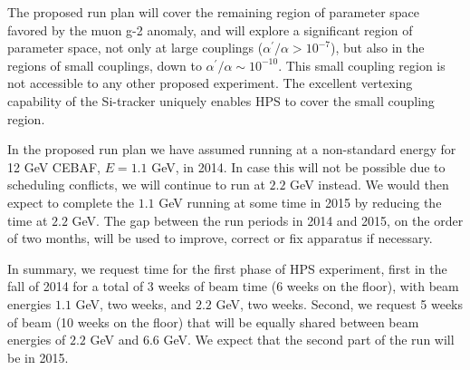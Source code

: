 The proposed run plan will cover the remaining region of parameter space favored by the muon \mbox{g-2} anomaly, and will explore a significant 
region of parameter space, not only at large couplings ($\alpha^\prime/\alpha>10^{-7}$), but also in the regions of small couplings, down 
to $\alpha^\prime/\alpha\sim 10^{-10}$. This small coupling region is not accessible to any other proposed experiment. 
The excellent vertexing capability of the Si-tracker uniquely enables HPS to cover the small coupling region. 

In the proposed run plan we have assumed running at a non-standard energy for 12 GeV CEBAF, $E=1.1$ GeV, in 2014. In case this will 
not be possible due to scheduling conflicts, we will continue to run at $2.2$ GeV instead. We would then expect to complete the $1.1$ 
GeV running at some time in 2015 by reducing the time at $2.2$ GeV. The gap between the run periods in 2014 
and 2015, on the order of two months, will be used to improve, correct or fix apparatus if necessary.

In summary, we request time for the first phase of HPS experiment, first in the fall of 2014 for a 
total of 3 weeks of beam time (6 weeks on the floor), with beam energies $1.1$ GeV, two weeks, and $2.2$ GeV, two weeks. 
Second, we request 5 weeks of beam (10 weeks on the floor) that will be equally shared between beam energies 
of $2.2$ GeV and $6.6$ GeV. We expect that the second part of the run will be in 2015.   

